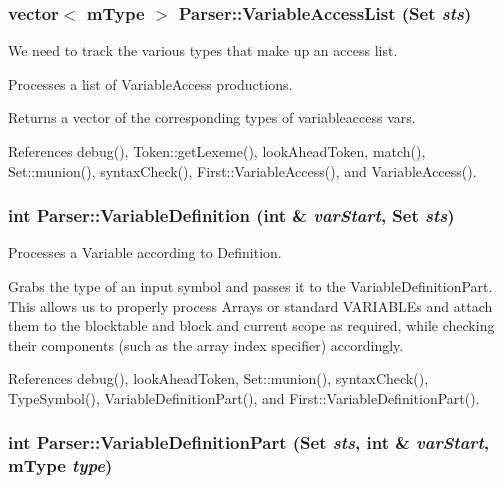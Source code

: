 \hypertarget{classParser_a83bdac30bb8bb5d9ee0c820b4d670179}{
\subsubsection[{VariableAccessList}]{\setlength{\rightskip}{0pt plus 5cm}vector$<$ {\bf mType} $>$ Parser::VariableAccessList ({\bf Set} {\em sts})}}
\label{classParser_a83bdac30bb8bb5d9ee0c820b4d670179}


We need to track the various types that make up an access list. 

Processes a list of VariableAccess productions.

Returns a vector of the corresponding types of variableaccess vars. 

References debug(), Token::getLexeme(), lookAheadToken, match(), Set::munion(), syntaxCheck(), First::VariableAccess(), and VariableAccess().

\hypertarget{classParser_a20052e491dc7c5f812dc2784f760731a}{
\subsubsection[{VariableDefinition}]{\setlength{\rightskip}{0pt plus 5cm}int Parser::VariableDefinition (int \& {\em varStart}, \/  {\bf Set} {\em sts})}}
\label{classParser_a20052e491dc7c5f812dc2784f760731a}


Processes a Variable according to Definition. 

Grabs the type of an input symbol and passes it to the VariableDefinitionPart. This allows us to properly process Arrays or standard VARIABLEs and attach them to the blocktable and block and current scope as required, while checking their components (such as the array index specifier) accordingly. 

References debug(), lookAheadToken, Set::munion(), syntaxCheck(), TypeSymbol(), VariableDefinitionPart(), and First::VariableDefinitionPart().

\hypertarget{classParser_a897a786bb66431b5f1cc0d3c76da5250}{
\subsubsection[{VariableDefinitionPart}]{\setlength{\rightskip}{0pt plus 5cm}int Parser::VariableDefinitionPart ({\bf Set} {\em sts}, \/  int \& {\em varStart}, \/  {\bf mType} {\em type})}}
\label{classParser_a897a786bb66431b5f1cc0d3c76da5250}


